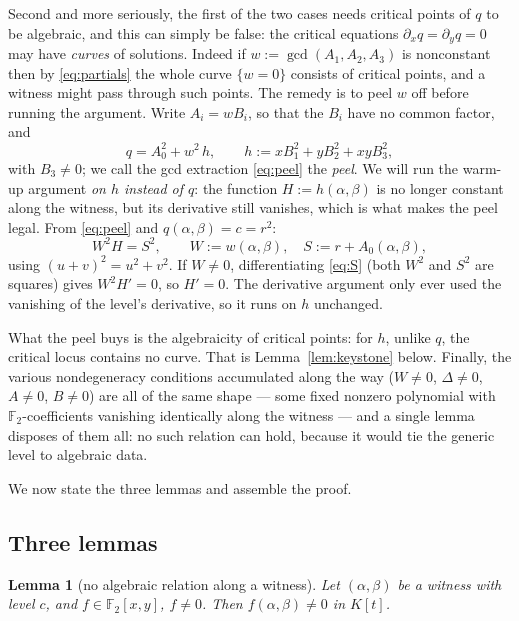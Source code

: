 \documentclass[11pt]{article}
\newtheorem{lemma}[theorem]{Lemma}
\theoremstyle{definition}
\theoremstyle{remark}
\newcommand{\F}{\mathbb{F}}
\begin{document}
Second and more seriously, the first of the two cases needs critical
points of $q$ to be algebraic, and this can simply be false: the
critical equations $\partial_x q = \partial_y q = 0$ may have
\emph{curves} of solutions.  Indeed if $w := \gcd(A_1, A_2, A_3)$ is
nonconstant then by \eqref{eq:partials} the whole curve $\{w = 0\}$
consists of critical points, and a witness might pass through such
points.  The remedy is to peel $w$ off before running the
argument.  Write $A_i = w B_i$, so that the $B_i$ have no common factor,
and
\begin{equation}\label{eq:peel}
  q = A_0^2 + w^2\, h,
  \qquad
  h := x B_1^2 + y B_2^2 + xy B_3^2 ,
\end{equation}
with $B_3 \neq 0$; we call the gcd extraction \eqref{eq:peel} the
\emph{peel}.  We will run the warm-up argument \emph{on $h$
instead of $q$}: the function
$H := h(\alpha,\beta)$ is no longer constant along the witness, but
its derivative still vanishes, which is what makes the peel legal.
From \eqref{eq:peel} and
$q(\alpha,\beta) = c = r^2$:
\begin{equation}\label{eq:S}
  W^2 H = S^2,
  \qquad
  W := w(\alpha,\beta), \quad S := r + A_0(\alpha,\beta),
\end{equation}
using $(u+v)^2 = u^2 + v^2$.  If $W \neq 0$, differentiating
\eqref{eq:S} (both $W^2$ and $S^2$ are squares) gives $W^2 H' = 0$,
so $H' = 0$.  The
derivative argument only ever used the vanishing of the level's
derivative, so it runs on $h$ unchanged.

What the peel buys is the algebraicity of critical points: for $h$,
unlike $q$, the critical locus contains no curve.  That is
Lemma~\ref{lem:keystone} below.  Finally, the various nondegeneracy conditions accumulated
along the way ($W \neq 0$, $\Delta \neq 0$, $A \neq 0$, $B \neq 0$)
are all of the same shape --- some fixed nonzero polynomial with
$\F_2$-coefficients vanishing identically along the witness --- and a
single lemma disposes of them all: no such relation can hold, because
it would tie the generic level to algebraic data.

We now state the three lemmas and assemble the proof.

\subsection{Three lemmas}

\begin{lemma}[no algebraic relation along a witness]\label{lem:kill}
Let $(\alpha,\beta)$ be a witness with level $c$, and
$f \in \F_2[x,y]$, $f \neq 0$.  Then $f(\alpha,\beta) \neq 0$ in
$K[t]$.
\end{lemma}
\end{document}
